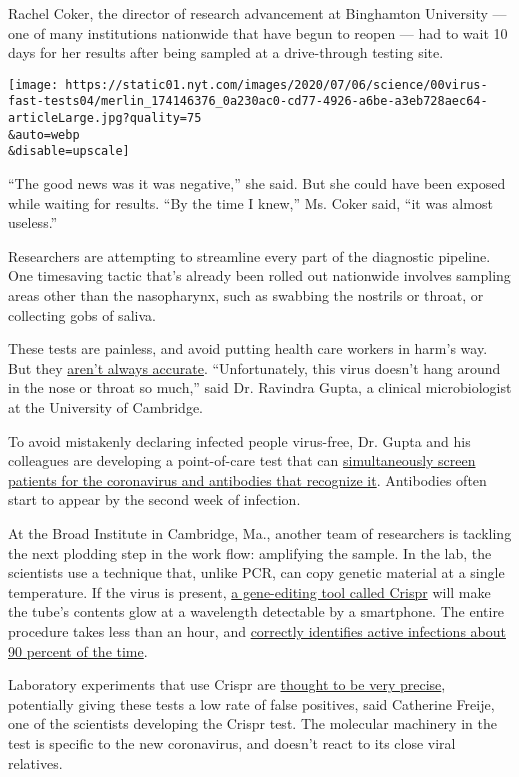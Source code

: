 Rachel Coker, the director of research advancement at Binghamton
University --- one of many institutions nationwide that have begun to
reopen --- had to wait 10 days for her results after being sampled at a
drive-through testing site.

\texttt{[image: https://static01.nyt.com/images/2020/07/06/science/00virus-fast-tests04/merlin\_174146376\_0a230ac0-cd77-4926-a6be-a3eb728aec64-articleLarge.jpg?quality=75\\\&auto=webp\\\&disable=upscale]}

``The good news was it was negative,'' she said. But she could have been
exposed while waiting for results. ``By the time I knew,'' Ms. Coker
said, ``it was almost useless.''

Researchers are attempting to streamline every part of the diagnostic
pipeline. One timesaving tactic that's already been rolled out
nationwide involves sampling areas other than the nasopharynx, such as
swabbing the nostrils or throat, or collecting gobs of saliva.

These tests are painless, and avoid putting health care workers in
harm's way. But they
\href{https://www.cebm.net/covid-19/comparative-accuracy-of-oropharyngeal-and-nasopharyngeal-swabs-for-diagnosis-of-covid-19/}{aren't
always accurate}. ``Unfortunately, this virus doesn't hang around in the
nose or throat so much,'' said Dr. Ravindra Gupta, a clinical
microbiologist at the University of Cambridge.

To avoid mistakenly declaring infected people virus-free, Dr. Gupta and
his colleagues are developing a point-of-care test that can
\href{https://www.medrxiv.org/content/10.1101/2020.06.16.20133157v3.full.pdf}{simultaneously
screen patients for the coronavirus and antibodies that recognize it}.
Antibodies often start to appear by the second week of infection.

At the Broad Institute in Cambridge, Ma., another team of researchers is
tackling the next plodding step in the work flow: amplifying the sample.
In the lab, the scientists use a technique that, unlike PCR, can copy
genetic material at a single temperature. If the virus is present,
\href{https://www.biorxiv.org/content/10.1101/2020.05.28.119131v1.full.pdf}{a
gene-editing tool called Crispr} will make the tube's contents glow at a
wavelength detectable by a smartphone. The entire procedure takes less
than an hour, and
\href{https://www.biorxiv.org/content/10.1101/2020.05.28.119131v1.full.pdf}{correctly
identifies active infections about 90 percent of the time}.

Laboratory experiments that use Crispr are
\href{https://www.ncbi.nlm.nih.gov/pmc/articles/PMC5915479/}{thought to
be very precise}, potentially giving these tests a low rate of false
positives, said Catherine Freije, one of the scientists developing the
Crispr test. The molecular machinery in the test is specific to the new
coronavirus, and doesn't react to its close viral relatives.

